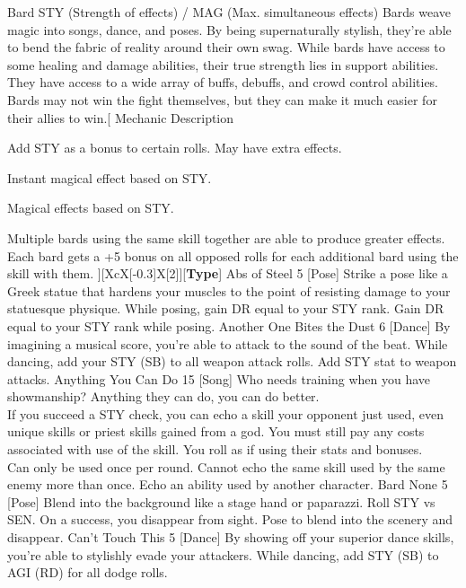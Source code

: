 ﻿\begin{path}
{Bard}
{STY (Strength of effects) / MAG (Max. simultaneous effects)}
{Bards weave magic into songs, dance, and poses. By being supernaturally stylish, they're able to bend the fabric of reality around their own swag.}
{While bards have access to some healing and damage abilities, their true strength lies in support abilities. They have access to a wide array of buffs, debuffs, and crowd control abilities. Bards may not win the fight themselves, but they can make it much easier for their allies to win.}[
Mechanic Description
\begin{wldescription}
\item [Dance:]  Add STY as a bonus to certain rolls. May have extra effects.
\item [Pose:]  Instant magical effect based on STY.
\item [Song:]  Magical effects based on STY.
\end{wldescription}
Multiple bards using the same skill together are able to produce greater effects. Each bard gets a +5 bonus on all opposed rolls for each additional bard using the skill with them.
][XcX[-0.3]X[2]][\textbf{Type}]
\skilldescription
{Abs of Steel}
{5}
[Pose]
{Strike a pose like a Greek statue that hardens your muscles to the point of resisting damage to your statuesque physique. While posing, gain DR equal to your STY rank.}
{Gain DR equal to your STY rank while posing.}
\skilldescription
{Another One Bites the Dust}
{6}
[Dance]
{By imagining a musical score, you're able to attack to the sound of the beat. While dancing, add your STY (SB) to all weapon attack rolls.}
{Add STY stat to weapon attacks.}
\skilldescription
{Anything You Can Do}
{15}
[Song]
{Who needs training when you have showmanship? Anything they can do, you can do better.
\\If you succeed a STY check, you can echo a skill your opponent just used, even unique skills or priest skills gained from a god. You must still pay any costs associated with use of the skill. You roll as if using their stats and bonuses.
\\Can only be used once per round. Cannot echo the same skill used by the same enemy more than once.}
{Echo an ability used by another character.}
\skilldescription
{Bard None}
{5}
[Pose]
{Blend into the background like a stage hand or paparazzi. Roll STY vs SEN. On a success, you disappear from sight.}
{Pose to blend into the scenery and disappear.}
\skilldescription
{Can't Touch This}
{5}
[Dance]
{By showing off your superior dance skills, you're able to stylishly evade your attackers. While dancing, add STY (SB) to AGI (RD) for all dodge rolls.}

\end{path}

